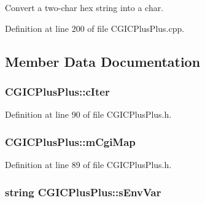 \-Convert a two-\/char hex string into a char. 



\-Definition at line 200 of file \-C\-G\-I\-C\-Plus\-Plus.\-cpp.



\subsection{\-Member \-Data \-Documentation}
\hypertarget{class_c_g_i_c_plus_plus_a7af1db5a11ab0700b407c22403e7435d}{
\subsubsection[{c\-Iter}]{ {\bf \-C\-G\-I\-C\-Plus\-Plus\-::c\-Iter}}}\label{class_c_g_i_c_plus_plus_a7af1db5a11ab0700b407c22403e7435d}


\-Definition at line 90 of file \-C\-G\-I\-C\-Plus\-Plus.\-h.

\hypertarget{class_c_g_i_c_plus_plus_ab9e93ef40ff2c7a9e5281148814793b3}{
\subsubsection[{m\-Cgi\-Map}]{ {\bf \-C\-G\-I\-C\-Plus\-Plus\-::m\-Cgi\-Map}}}\label{class_c_g_i_c_plus_plus_ab9e93ef40ff2c7a9e5281148814793b3}


\-Definition at line 89 of file \-C\-G\-I\-C\-Plus\-Plus.\-h.

\hypertarget{class_c_g_i_c_plus_plus_abf093cd7afffe33ae0d514a7cf38ea24}{
\subsubsection[{s\-Env\-Var}]{\setlength{\rightskip}{0pt plus 5cm}string {\bf \-C\-G\-I\-C\-Plus\-Plus\-::s\-Env\-Var}}}\label{class_c_g_i_c_plus_plus_abf093cd7afffe33ae0d514a7cf38ea24}


